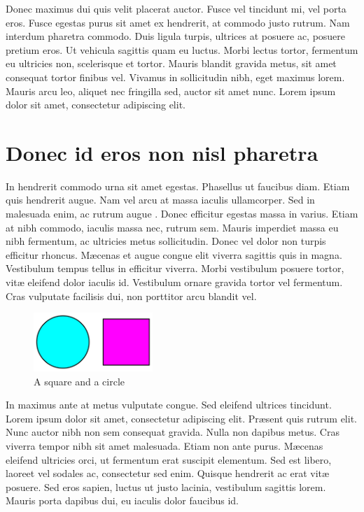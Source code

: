Donec maximus dui quis velit placerat auctor. Fusce vel tincidunt mi, vel porta eros. Fusce egestas purus sit amet ex hendrerit, at commodo justo rutrum. Nam interdum pharetra commodo. Duis ligula turpis, ultrices at posuere ac, posuere pretium eros. Ut vehicula sagittis quam eu luctus. Morbi lectus tortor, fermentum eu ultricies non, scelerisque et tortor. Mauris blandit gravida metus, sit amet consequat tortor finibus vel. Vivamus in sollicitudin nibh, eget maximus lorem. Mauris arcu leo, aliquet nec fringilla sed, auctor sit amet nunc. Lorem ipsum dolor sit amet, consectetur adipiscing elit. 


\section{Donec id eros non nisl pharetra} %

In hendrerit commodo urna sit amet egestas. Phasellus ut faucibus diam. Etiam quis hendrerit augue. Nam vel arcu at massa iaculis ullamcorper. Sed in malesuada enim, ac rutrum augue \cite{DBLP:journals/ai/Lenat83a}. Donec efficitur egestas massa in varius. Etiam at nibh commodo, iaculis massa nec, rutrum sem. Mauris imperdiet massa eu nibh fermentum, ac ultricies metus sollicitudin. Donec vel dolor non turpis efficitur rhoncus. M\ae{}cenas et augue congue elit viverra sagittis quis in magna. Vestibulum tempus tellus in efficitur viverra. Morbi vestibulum posuere tortor, vit\ae{} eleifend dolor iaculis id. Vestibulum ornare gravida tortor vel fermentum. Cras vulputate facilisis dui, non porttitor arcu blandit vel.

\begin{figure}
  \centering
  \includegraphics[width=0.4\textwidth]{fig/square-circle}
  \caption{A square and a circle}
  \label{fig:square-circle}
\end{figure}

In maximus ante at metus vulputate congue. Sed eleifend ultrices tincidunt. Lorem ipsum dolor sit amet, consectetur adipiscing elit. Pr\ae{}sent quis rutrum elit. Nunc auctor nibh non sem consequat gravida. Nulla non dapibus metus. Cras viverra tempor nibh sit amet malesuada. Etiam non ante purus. M\ae{}cenas eleifend ultricies orci, ut fermentum erat suscipit elementum. Sed est libero, laoreet vel sodales ac, consectetur sed enim. Quisque hendrerit ac erat vit\ae{} posuere. Sed eros sapien, luctus ut justo lacinia, vestibulum sagittis lorem. Mauris porta dapibus dui, eu iaculis dolor faucibus id. 

